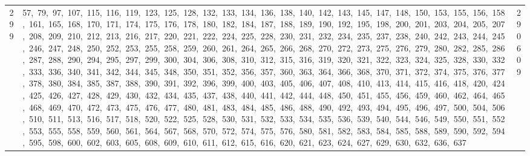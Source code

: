 \begin{longtable}{c|p{}|r}
299 & 57,\ 79,\ 97,\ 107,\ 115,\ 116,\ 119,\ 123,\ 125,\ 128,\ 132,\ 133,\ 134,\ 136,\ 138,\ 140,\ 142,\ 143,\ 145,\ 147,\ 148,\ 150,\ 153,\ 155,\ 156,\ 158,\ 161,\ 165,\ 168,\ 170,\ 171,\ 174,\ 175,\ 176,\ 178,\ 180,\ 182,\ 184,\ 187,\ 188,\ 189,\ 190,\ 192,\ 195,\ 198,\ 200,\ 201,\ 203,\ 204,\ 205,\ 207,\ 208,\ 209,\ 210,\ 212,\ 213,\ 216,\ 217,\ 220,\ 221,\ 222,\ 224,\ 225,\ 228,\ 230,\ 231,\ 232,\ 234,\ 235,\ 237,\ 238,\ 240,\ 242,\ 243,\ 244,\ 245,\ 246,\ 247,\ 248,\ 250,\ 252,\ 253,\ 255,\ 258,\ 259,\ 260,\ 261,\ 264,\ 265,\ 266,\ 268,\ 270,\ 272,\ 273,\ 275,\ 276,\ 279,\ 280,\ 282,\ 285,\ 286,\ 287,\ 288,\ 290,\ 294,\ 295,\ 297,\ 299,\ 300,\ 304,\ 306,\ 308,\ 310,\ 312,\ 315,\ 316,\ 319,\ 320,\ 321,\ 322,\ 323,\ 324,\ 325,\ 328,\ 330,\ 332,\ 333,\ 336,\ 340,\ 341,\ 342,\ 344,\ 345,\ 348,\ 350,\ 351,\ 352,\ 356,\ 357,\ 360,\ 363,\ 364,\ 366,\ 368,\ 370,\ 371,\ 372,\ 374,\ 375,\ 376,\ 377,\ 378,\ 380,\ 384,\ 385,\ 387,\ 388,\ 390,\ 391,\ 392,\ 396,\ 399,\ 400,\ 403,\ 405,\ 406,\ 407,\ 408,\ 410,\ 413,\ 414,\ 415,\ 416,\ 418,\ 420,\ 424,\ 425,\ 426,\ 427,\ 428,\ 429,\ 430,\ 432,\ 434,\ 435,\ 437,\ 438,\ 440,\ 441,\ 442,\ 444,\ 448,\ 450,\ 451,\ 455,\ 456,\ 459,\ 460,\ 462,\ 464,\ 465,\ 468,\ 469,\ 470,\ 472,\ 473,\ 475,\ 476,\ 477,\ 480,\ 481,\ 483,\ 484,\ 485,\ 486,\ 488,\ 490,\ 492,\ 493,\ 494,\ 495,\ 496,\ 497,\ 500,\ 504,\ 506,\ 510,\ 511,\ 513,\ 516,\ 517,\ 518,\ 520,\ 522,\ 525,\ 528,\ 530,\ 531,\ 532,\ 533,\ 534,\ 535,\ 536,\ 539,\ 540,\ 544,\ 546,\ 549,\ 550,\ 551,\ 552,\ 553,\ 555,\ 558,\ 559,\ 560,\ 561,\ 564,\ 567,\ 568,\ 570,\ 572,\ 574,\ 575,\ 576,\ 580,\ 581,\ 582,\ 583,\ 584,\ 585,\ 588,\ 589,\ 590,\ 592,\ 594,\ 595,\ 598,\ 600,\ 602,\ 603,\ 605,\ 608,\ 609,\ 610,\ 611,\ 612,\ 615,\ 616,\ 620,\ 621,\ 623,\ 624,\ 627,\ 629,\ 630,\ 632,\ 636,\ 637 & 290609 \\

\end{longtable}
